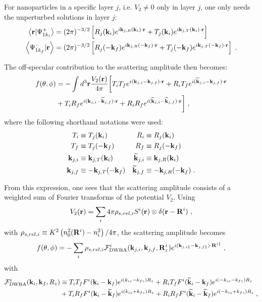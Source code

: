 For nanoparticles in a specific layer $j$, i.e. $V_2\neq0$ only in layer $j$, one only needs the unperturbed solutions in layer $j$:
\begin{align*}
  \left\langle \mathbf{r} \vert \Psi^+_{1k_i} \right\rangle &= (2\pi)^{-3/2}\left[ R_j(\mathbf{k}_i) e^{i \mathbf{k}_{j,R}(\mathbf{k}_i)\cdot\mathbf{r}} + T_j(\mathbf{k}_i) e^{i \mathbf{k}_{j,T}(\mathbf{k}_i)\cdot\mathbf{r}} \right] \\
  \left\langle \Psi^-_{1k_f} \vert \mathbf{r} \right\rangle &= (2\pi)^{-3/2}\left[ R_j(-\mathbf{k}_f) e^{i \mathbf{k}_{j,R}(-\mathbf{k}_f)\cdot\mathbf{r}} + T_j(-\mathbf{k}_f) e^{i \mathbf{k}_{j,T}(-\mathbf{k}_f)\cdot\mathbf{r}} \right] \; .
\end{align*}

The off-specular contribution to the scattering amplitude then becomes:
\begin{align*}
  f(\theta, \phi) &= -\int d^3\mathbf{r} \frac{V_2(\mathbf{r})}{4\pi} \biggl[ T_iT_fe^{i(\mathbf{k}_{j,i}-\mathbf{k}_{j,f})\cdot\mathbf{r}} + R_iT_fe^{i(\mathbf{\widetilde{k}}_{j,i}-\mathbf{k}_{j,f})\cdot\mathbf{r}} \\
   & + T_iR_fe^{i(\mathbf{k}_{j,i}-\mathbf{\widetilde{k}}_{j,f})\cdot\mathbf{r}} + R_iR_fe^{i(\mathbf{\widetilde{k}}_{j,i}-\mathbf{\widetilde{k}}_{j,f})\cdot\mathbf{r}} \biggr] \; ,
\end{align*}
where the following shorthand notations were used:
\begin{align*}
  T_i &\equiv  T_j(\mathbf{k}_i) & R_i &\equiv  R_j(\mathbf{k}_i)  \\
  T_f &\equiv  T_j(-\mathbf{k}_f) & R_f &\equiv  R_j(-\mathbf{k}_f) \\
  \mathbf{k}_{j,i} &\equiv \mathbf{k}_{j,T}(\mathbf{k}_i) & \mathbf{\widetilde{k}}_{j,i} &\equiv \mathbf{k}_{j,R}(\mathbf{k}_i)  \\
  \mathbf{k}_{j,f} &\equiv -\mathbf{k}_{j,T}(-\mathbf{k}_f) & \mathbf{\widetilde{k}}_{j,f} &\equiv -\mathbf{k}_{j,R}(-\mathbf{k}_f) \; .
\end{align*}

From this expression, one sees that the scattering amplitude consists of a weighted sum of Fourier transforms of the potential $V_2$. Using
\begin{equation*}
  V_2(\mathbf{r}) = \sum_i 4\pi \rho_{s,rel,i} S^i(\mathbf{r}) \otimes \delta(\mathbf{r} - \mathbf{R}^i) \; ,
\end{equation*}
with $\rho_{s,rel,i}\equiv  K^2\left( n_0^2(\mathbf{R}^i) - n_i^2 \right)/4\pi$, the scattering amplitude becomes
\begin{equation*}
  f(\theta, \phi) = -\sum_i  \rho_{s,rel,i} \mathcal{F}^i_{\text{DWBA}}(\mathbf{k}_{j,i},\mathbf{k}_{j,f},\mathbf{R}^i_z)e^{i(\mathbf{k}_{j,i\parallel}-\mathbf{k}_{j,f\parallel})\cdot \mathbf{R}^{i\parallel} } \; ,
\end{equation*}
with
\begin{align*}
  \mathcal{F}^i_\text{DWBA}(\mathbf{k}_i,\mathbf{k}_f,R_z) & \equiv T_iT_fF^i(\mathbf{k}_i-\mathbf{k}_f)e^{i(k_{iz}-k_{fz})R_z} + R_iT_fF^i(\mathbf{\widetilde{k}}_i-\mathbf{k}_f)e^{i(-k_{iz}-k_{fz})R_z} \\
  & + T_iR_fF^i(\mathbf{k}_i-\mathbf{\widetilde{k}}_f)e^{i(k_{iz}+k_{fz})R_z} + R_iR_fF^i(\mathbf{\widetilde{k}}_i-\mathbf{\widetilde{k}}_f)e^{i(-k_{iz}+k_{fz})R_z} \; ,
\end{align*}

